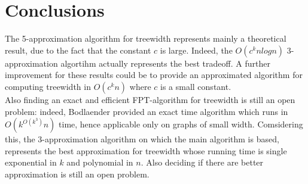 \documentclass{article}
\theoremstyle{definition}
\theoremstyle{lemma}
\theoremstyle{corollary}
\theoremstyle{theorem}
\begin{document}
\section{Conclusions}
The 5-approximation algorithm for treewidth represents mainly a theoretical result, due to the fact that the constant $c$ is large. Indeed, the $O(c^k nlogn)$ 3-approximation algortihm actually represents the best tradeoff. A further improvement for these results could be to provide an approximated algorithm for computing treewidth in $O(c^kn)$ where $c$ is a small constant. \\
Also finding an exact and efficient FPT-algorithm for treewidth is still an open problem: indeed, Bodlaender provided an exact time algorithm which runs in $O(k^{O(k^3)}n)$ time, hence applicable only on graphs of small width. Comsidering this, the 3-approximation algorithm on which the main algorithm is based, represents the best approximation for treewidth whose running time is single exponential in $k$ and polynomial in $n$. Also deciding if there are better approximation is still an open problem.

\newpage



\end{document}
